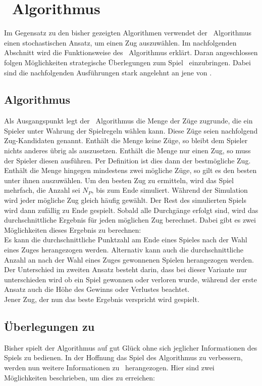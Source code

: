\section{\mc\ Algorithmus}
\label{mc_algo}
\authormax
Im Gegensatz zu den bisher gezeigten Algorithmen verwendet der \mc\ Algorithmus einen stochastischen Ansatz, um einen Zug auszuwählen. Im nachfolgenden Abschnitt wird die Funktionsweise des \mc\ Algorithmus erklärt. Daran angeschlossen folgen Möglichkeiten strategische Überlegungen zum Spiel \ot\ einzubringen. Dabei sind die nachfolgenden Ausführungen stark angelehnt an jene von \cite{nijssen_2007}.
\subsection{Algorithmus}
Als Ausgangspunkt legt der \mc\ Algorithmus die Menge der Züge zugrunde, die ein Spieler unter Wahrung der Spielregeln wählen kann. Diese Züge seien nachfolgend Zug-Kandidaten genannt. Enthält die Menge keine Züge, so bleibt dem Spieler nichts anderes übrig als auszusetzen. Enthält die Menge nur einen Zug, so muss der Spieler diesen ausführen. Per Definition ist dies dann der bestmögliche Zug. Enthält die Menge hingegen mindestens zwei mögliche Züge, so gilt es den besten unter ihnen auszuwählen. Um den besten Zug zu ermitteln, wird das Spiel mehrfach, die Anzahl sei $N_{P}$, bis zum Ende simuliert. Während der Simulation wird jeder mögliche Zug gleich häufig gewählt. Der Rest des simulierten Spiels wird dann zufällig zu Ende gespielt. Sobald alle Durchgänge erfolgt sind, wird das durchschnittliche Ergebnis für jeden möglichen Zug berechnet. Dabei gibt es zwei Möglichkeiten dieses Ergebnis zu berechnen:\\
Es kann die durchschnittliche Punktzahl am Ende eines Spieles nach der Wahl eines Zuges herangezogen werden. Alternativ kann auch die durchschnittliche Anzahl an nach der Wahl eines Zuges gewonnenen Spielen herangezogen werden. Der Unterschied im zweiten Ansatz besteht darin, dass bei dieser Variante nur unterschieden wird ob ein Spiel gewonnen oder verloren wurde, während der erste Ansatz auch die Höhe des Gewinns oder Verlustes beachtet.
\\Jener Zug, der nun das beste Ergebnis verspricht wird gespielt.
\subsection{Überlegungen zu \ot}
Bisher spielt der Algorithmus auf gut Glück ohne sich jeglicher Informationen des Spiels zu bedienen. In der Hoffnung das Spiel des Algorithmus zu verbessern, werden nun weitere Informationen zu \ot\ herangezogen. Hier sind zwei Möglichkeiten beschrieben, um dies zu erreichen:
